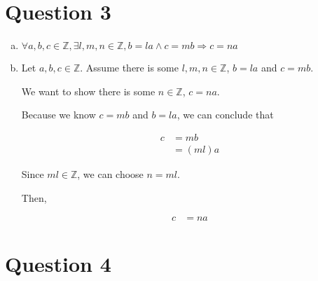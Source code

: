 \documentclass[12pt]{article}
\begin{document}
\section*{Question 3}
\begin{enumerate}[a.]
    \item

    $\forall a,b,c \in \mathbb{Z}, \exists l,m,n \in \mathbb{Z}, b = la \land c = mb
    \Rightarrow c = na$

    \item

    Let $a,b,c \in \mathbb{Z}$. Assume there is some $l,m,n \in \mathbb{Z}$,
    $b = la$ and $c = mb$.

    \bigskip

    We want to show there is some $n \in \mathbb{Z}$, $c = na$.

    \bigskip

    Because we know $c = mb$ and $b = la$, we can conclude that

    \begin{align}
        c &= mb\\
        &= (ml)a
    \end{align}

    \bigskip

    Since $ml \in \mathbb{Z}$, we can choose $n = ml$.

    \bigskip

    Then,

    \begin{align}
        c &= na
    \end{align}

\end{enumerate}

\section*{Question 4}
\end{document}
